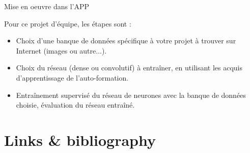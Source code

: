 \documentclass[10pt,serif,mathserif,compress,hyperref={colorlinks}]{beamer}
\begin{document}
\begin{frame}{Mise en oeuvre dans l'APP}

  \begin{tcolorbox}[title=3 -- Projet : Entraîner un réseau de neurone avec une banque de données spécifique]

    Pour ce projet d’équipe, les étapes sont :

    \begin{itemize}
    \item Choix d’une banque de données spécifique à votre projet à trouver sur Internet (images ou autre...).
    \item Choix du réseau (dense ou convolutif) à entraîner, en utilisant les acquis d’apprentissage de l'auto-formation.
    \item Entraînement supervisé du réseau de neurones avec la banque de données choisie, évaluation du réseau entraîné.
    \end{itemize}
    
  \end{tcolorbox}

\end{frame}

\section{Links \& bibliography}
\end{document}
